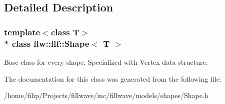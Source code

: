 \subsection{Detailed Description}
\subsubsection*{template$<$class T$>$\\*
class flw\+::flf\+::\+Shape$<$ T $>$}

Base class for every shape. Specialized with Vertex data structure. 

The documentation for this class was generated from the following file\+:\begin{DoxyCompactItemize}
\item 
/home/filip/\+Projects/fillwave/inc/fillwave/models/shapes/Shape.\+h\end{DoxyCompactItemize}

